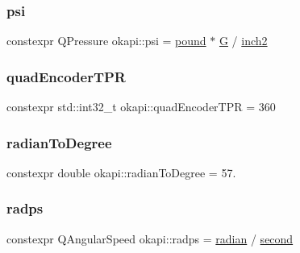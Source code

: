 \mbox{\label{namespaceokapi_acbf7dd00498df55f8f7322dfaa97e654}} 
\subsubsection{\texorpdfstring{psi}{psi}}
{\footnotesize\ttfamily constexpr Q\+Pressure okapi\+::psi = \mbox{\hyperlink{namespaceokapi_a15f5612272759c7efdcab4bae5b4fa09}{pound}} $\ast$ \mbox{\hyperlink{namespaceokapi_a6e00ff72f863a56a3fc99ca94f106a5a}{G}} / \mbox{\hyperlink{namespaceokapi_ac232406bb408f51239ae71a3bd566a12}{inch2}}}

\mbox{\label{namespaceokapi_ad45ebef87cdaccd36ca4234d0bfdeee3}} 
\subsubsection{\texorpdfstring{quadEncoderTPR}{quadEncoderTPR}}
{\footnotesize\ttfamily constexpr std\+::int32\+\_\+t okapi\+::quad\+Encoder\+T\+PR = 360\hspace{0.3cm}{\ttfamily [static]}}

\mbox{\label{namespaceokapi_aa1f1932af0b3ec79171c302a2ed2349e}} 
\subsubsection{\texorpdfstring{radianToDegree}{radianToDegree}}
{\footnotesize\ttfamily constexpr double okapi\+::radian\+To\+Degree = 57.\hspace{0.3cm}{\ttfamily [static]}}

\mbox{\label{namespaceokapi_aec15098b7cc08fb5c6c99faa058a1f72}} 
\subsubsection{\texorpdfstring{radps}{radps}}
{\footnotesize\ttfamily constexpr Q\+Angular\+Speed okapi\+::radps = \mbox{\hyperlink{namespaceokapi_a58aeaa1abc59d23d0790a77d53f1d26b}{radian}} / \mbox{\hyperlink{namespaceokapi_ae9ece1daf9cd9f6d3a597cc5c0dc7b40}{second}}}


